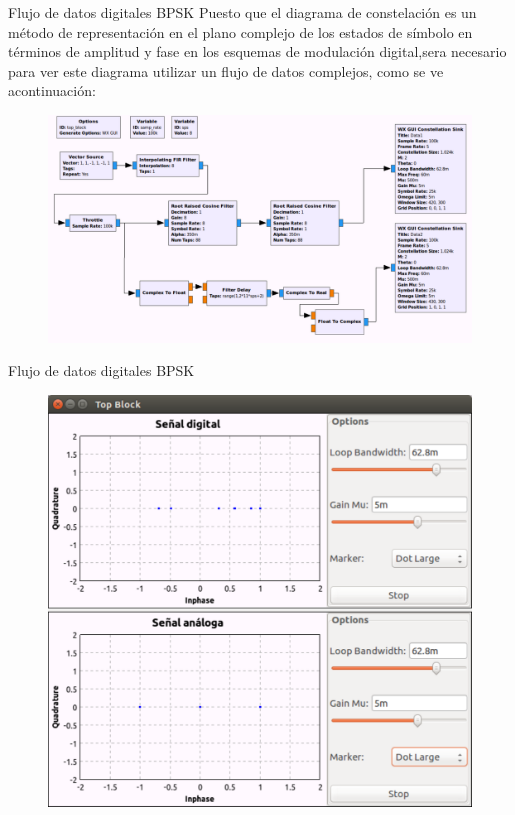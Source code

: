 \begin{frame}{Flujo de datos digitales BPSK}
\justifying
Puesto que el diagrama de constelación es un método de representación en el plano complejo de los estados de símbolo en términos de amplitud y fase en los esquemas de modulación digital,sera necesario para ver este diagrama  utilizar un flujo de datos complejos, como se ve acontinuación:
\begin{figure}
\includegraphics[width=.9\textwidth]{parte1/lab5/pdf/lab5_5.pdf}
\end{figure}
\end{frame}
\begin{frame}{Flujo de datos digitales BPSK}
\begin{figure}
\includegraphics[width=.6\textwidth]{parte1/lab5/pdf/lab5_6.pdf}
\end{figure}
\end{frame}
 